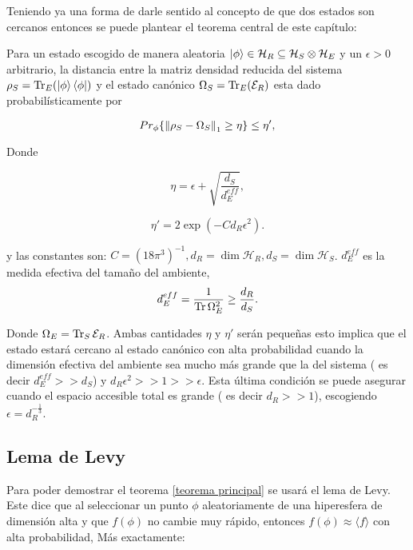 Teniendo ya una forma de darle sentido al concepto de que dos estados son cercanos entonces se puede plantear el teorema central de este capítulo:
\\
\begin{theorem} \label{cap2 teorema principal}
Para un estado escogido de manera aleatoria $\ket{\phi} \in \mathcal{H}_{R} \subseteq \mathcal{H}_{S} \otimes \mathcal{H}_{E} $ y un $\epsilon > 0$ arbitrario, la distancia entre la matriz densidad reducida del sistema $\rho_{S}=\Tr_{E}(\ket{\phi} \bra{\phi})$  y el estado canónico $\Omega_{S}=\Tr_{E} ( \mathcal{E}_{R})$ esta dado probabilísticamente por 

\begin{equation}
Pr_{\phi} \{  \norm{\rho_{S} -\Omega_{S}}_{1} \geq \eta \} \leq \eta',
\end{equation}

Donde 

\begin{equation}
\eta= \epsilon + \sqrt{ \frac{d_{S}}{d_{E}^{eff}} },
\end{equation}

\begin{equation}
\eta'=2\exp (-C d_{R} \epsilon^{2} ).
\end{equation}


y las constantes son: $ C=(18 \pi^{3})^{-1}, d_{R} = \dim \mathcal{H}_{R}, d_{S} = \dim \mathcal{H}_{S} $. $d_{E}^{eff}$ es la medida efectiva del tamaño del ambiente,
\begin{equation}
d_{E}^{eff}= \frac{1}{\Tr \Omega_{E}^{2}} \ge \frac{d_{R}}{d_{S}}.
\end{equation}

Donde $\Omega_{E}= \Tr_{S} \mathcal{E}_{R}$. Ambas cantidades $\eta $ y $\eta'$ serán pequeñas esto implica que el estado estará cercano al estado canónico con alta probabilidad cuando la dimensión efectiva del ambiente sea mucho más grande que la del sistema ( es decir $d_{E}^{eff} >> d_{S}$) y  $d_{R}\epsilon^2>>1>>\epsilon$. Esta última condición se puede asegurar cuando el espacio accesible total es grande ( es decir $d_{R}>>1$), escogiendo $\epsilon=d_{R}^{-\frac{1}{3}}$.\\
\end{theorem}

\subsection{Lema de Levy} \label{cap2 levy}
Para poder demostrar el teorema \ref{teorema principal} se usará  el lema de Levy. Este dice que al seleccionar un punto $\phi$ aleatoriamente de una hiperesfera de dimensión alta y que $f(\phi)$ no cambie muy rápido, entonces $f(\phi) \approx \langle f \rangle $ con alta probabilidad, Más exactamente:\\

